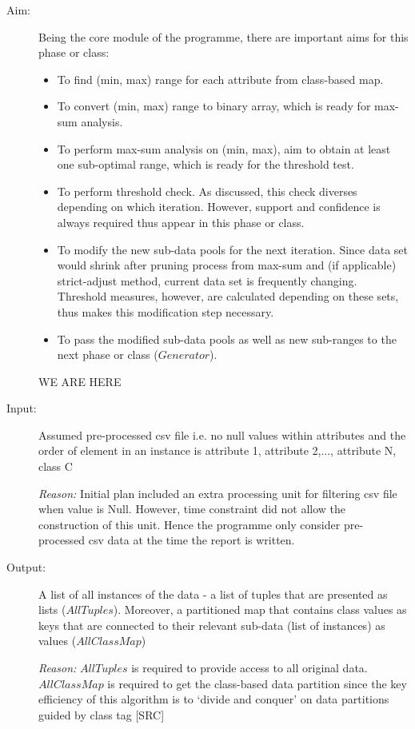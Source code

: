 \begin{description}

\item[Aim: ] Being the core module of the programme, there are important aims for this phase or class:
\begin{itemize}
	\item{To find (min, max) range for each attribute from class-based map.} 
	\item{To convert (min, max) range to binary array, which is ready for max-sum analysis.} 
	\item{To perform max-sum analysis on (min, max), aim to obtain at least one sub-optimal range, which is ready for the threshold test.} 
	\item{To perform threshold check. As discussed, this check diverses depending on which iteration. However, support and confidence is always required thus appear in this phase or class.} 
	\item{To modify the new sub-data pools for the next iteration. Since data set would shrink after pruning process from max-sum and (if applicable) strict-adjust method, current data set is frequently changing. Threshold measures, however, are calculated depending on these sets, thus makes this modification step necessary.} 
	\item{To pass the modified sub-data pools as well as new sub-ranges to the next phase or class ($Generator$).} 
\end{itemize}

WE ARE HERE

\item[Input: ] Assumed pre-processed csv file i.e. no null values within attributes and the order of element in an instance is {attribute 1, attribute 2,..., attribute N, class C}

\textit{Reason: } Initial plan included an extra processing unit for filtering csv file when value is Null. However, time constraint did not allow the construction of this unit. Hence the programme only consider pre-processed csv data at the time the report is written.

\item[Output: ] A list of all instances of the data - a list of tuples that are presented as lists ($AllTuples$). Moreover, a partitioned map that contains class values as keys that are connected to their relevant sub-data (list of instances) as values ($AllClassMap$)
  
\textit{Reason: } $AllTuples$ is required to provide access to all original data. $AllClassMap$ is required to get the class-based data partition since the key efficiency of this algorithm is to `divide and conquer' on data partitions guided by class tag [SRC]


\end{description}
